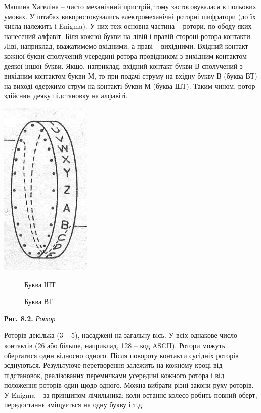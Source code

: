 \documentclass[a4paper]{article}
\newcounter{}
\begin{document}
Машина Хагеліна – чисто механічний пристрій, тому застосовувалася в польових
умовах. У штабах використовувались електромеханічні роторні шифратори (до їх
числа належить і Enigma). У них теж основна частина – ротори, по ободу яких
нанесений алфавіт. Біля кожної букви на лівій і правій стороні ротора контакти.
Ліві, наприклад, вважатимемо вхідними, а праві – вихідними. Вхідний контакт
кожної букви сполучений усередині ротора провідником з вихідним контактом
деякої іншої букви. Якщо, наприклад, вхідний контакт букви В сполучений з
вихідним контактом букви М, то при подачі струму на вхідну букву В (буква ВТ)
на виході одержимо струм на контакті букви М (буква ШТ). Таким чином, ротор
здійснює деяку підстановку на алфавіті.

{\centering 
\includegraphics[width=1.7083in,height=3.3335in]{crypt-img/crypt-img78.jpg}
\par}

\begin{figure}
\centering
\begin{minipage}{0.9374in}
Буква ШТ
\end{minipage}
\end{figure}
\begin{figure}
\centering
\begin{minipage}{0.9665in}
Буква ВТ
\end{minipage}
\end{figure}
{\centering
\textbf{Рис. 8.2.  }\textit{Ротор}
\par}


\bigskip

Роторів декілька (3 – 5), насаджені на загальну вісь. У всіх однакове число
контактів (26 або більше, наприклад, 128 – код ASCII). Ротори можуть обертатися
один відносно одного. Після повороту контакти сусідніх роторів
з{\textquotesingle}єднуються. Результуюче перетворення залежить на кожному
кроці від підстановок, реалізованих перемичками усередині кожного ротора і від
положення роторів один щодо одного. Можна вибрати різні закони руху роторів. У
Enigma – за принципом лічильника: коли останнє колесо робить повний оберт,
передостаннє зміщується на одну букву і т.д.
\end{document}
